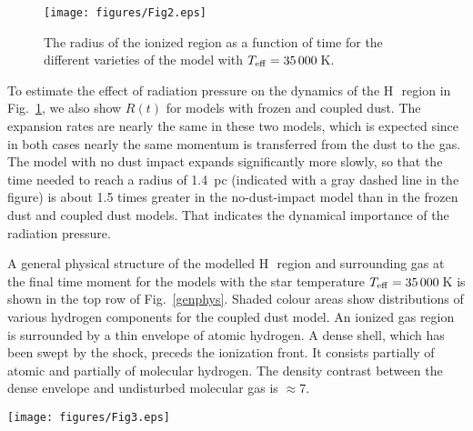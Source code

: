 \documentclass[a4paper,fleqn,usenatbib]{mnras}
\newcommand{\hii}    {H\,{\sc{ii}}~}
\begin{document}
\begin{figure}
\centering
\texttt{[image: figures/Fig2.eps]}
\caption{The radius of the ionized region as a function of time for the different varieties of the model with $T_{\rm eff}=35\,000$\,K.}
\label{radiushiiregiontime}
\end{figure}

To estimate the effect of radiation pressure on the dynamics of the \hii region in Fig.~\ref{radiushiiregiontime}, we also show $R(t)$ for models with frozen and coupled dust. The expansion rates are nearly the same in these two models, which is expected since in both cases nearly the same momentum is transferred from the dust to the gas. The model with no dust impact expands significantly more slowly, so that the time needed to reach a radius of 1.4~pc (indicated with a gray dashed line in the figure) is about 1.5 times greater in the no-dust-impact model than in the frozen dust and coupled dust models. That indicates the dynamical importance of the  radiation pressure.

A general physical structure of the modelled \hii region and surrounding gas at the final time moment for the models with the star temperature $T_{\rm eff}=35\,000$\,K is shown in the top row of Fig.~\ref{genphys}. Shaded colour areas show distributions of various hydrogen components for the coupled dust model. An ionized gas region is surrounded by a thin envelope of atomic hydrogen. A dense shell, which has been swept by the shock, preceds the ionization front. It consists partially of atomic and partially of molecular hydrogen. The density contrast between the dense envelope and undisturbed molecular gas is $\approx7$.

\begin{figure*}
\centering
\texttt{[image: figures/Fig3.eps]}
\caption{Top row: Summary of the physical structure of the modelled region, when the \hii region radius is approximately equal to 1.4~pc, for the models with a stellar temperature of 35\,000\,K and different treatments of dust-gas coupling. Left: distributions of the total density (coloured lines) as well as of ionized, neutral, and molecular hydrogen (shaded areas, for the coupled dust model only) are shown. Right: velocity distributions. Bottom row: Diagrams showing carbonaceous (left) and silicate (right) dust size distributions as a function of radius at the final time moment for the coupled dust model. The size distributions at the right borders of the diagrams are almost identical to the adopted initial distributions.}
\label{genphys}
\end{figure*}
\end{document}
